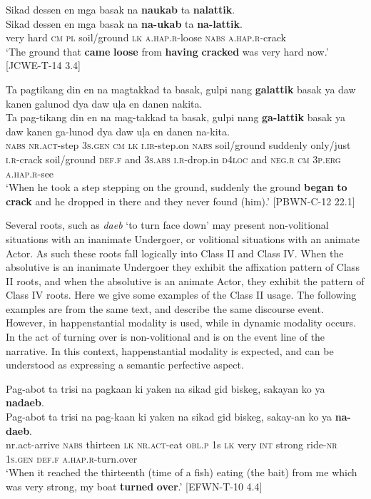 \ea
Sikad  dessen  en  mga  basak  na  \textbf{naukab}  ta  \textbf{nalattik}. \\\smallskip
\gll Sikad  dessen  en  mga  basak  na  \textbf{na-ukab}  ta  \textbf{na-lattik}. \\
very  hard  \textsc{cm}  \textsc{pl}  soil/ground  \textsc{lk}  \textsc{a.hap.r}-loose  \textsc{nabs}  \textsc{a.hap.r}-crack \\
\glt ‘The ground that \textbf{came} \textbf{loose} from \textbf{having} \textbf{cracked} was very hard now.’ [JCWE-T-14 3.4]
\z

\ea
Ta  pagtikang  din  en  na  magtakkad  ta  basak, gulpi  nang  \textbf{galattik}  basak  ya  daw  kanen  galunod  dya daw  uļa  en  danen  nakita. \\\smallskip
\gll Ta  pag-tikang  din  en  na  mag-takkad  ta  basak, gulpi  nang  \textbf{ga-lattik}  basak  ya  daw  kanen  ga-lunod  dya daw  uļa  en  danen  na-kita. \\
\textsc{nabs}  \textsc{nr.act}-step  3\textsc{s.gen}  \textsc{cm}  \textsc{lk}  \textsc{i.ir}-step.on  \textsc{nabs} soil/ground suddenly  only/just  \textsc{i.r}-crack  soil/ground  \textsc{def.f}  and  3\textsc{s.abs}  \textsc{i.r}-drop.in  \textsc{d4loc} and  \textsc{neg.r}  \textsc{cm}  3\textsc{p.erg}  \textsc{a.hap.r}-see \\
\glt ‘When he took a step stepping on the ground, suddenly the ground \textbf{began} \textbf{to} \textbf{crack} and he dropped in there and they never found (him).’ [PBWN-C-12 22.1]
\z

Several roots, such as \textit{daeb} ‘to turn face down’ may present non-volitional situations with an inanimate Undergoer, or volitional situations with an animate Actor. As such these roots fall logically into Class II and Class IV. When the absolutive is an inanimate Undergoer they exhibit the affixation pattern of Class II roots, and when the absolutive is an animate Actor, they exhibit the pattern of Class IV roots. Here we give some examples of the Class II usage. The following examples are from the same text, and describe the same discourse event. However, in  happenstantial modality is used, while in  dynamic modality occurs. In  the act of turning over is non-volitional and is on the event line of the narrative. In this context, happenstantial modality is expected, and can be understood as expressing a semantic perfective aspect. 

\ea
\label{bkm:Ref148966026}
Pag-abot  ta  trisi  na  pagkaan  ki  yaken  na  sikad  gid  biskeg,   sakayan  ko  ya  \textbf{nadaeb}. \\\smallskip
\gll Pag-abot  ta  trisi  na  pag-kaan  ki  yaken  na  sikad  gid  biskeg,   sakay-an  ko  ya  \textbf{na-daeb}. \\
{nr.act}-arrive  \textsc{nabs}  thirteen  \textsc{lk}  \textsc{nr.act}-eat  \textsc{obl.p}  1s  \textsc{lk} very  \textsc{int}  strong
ride-\textsc{nr}  1\textsc{s.gen}  \textsc{def.f}  \textsc{a.hap.r}-turn.over \\
\glt  ‘When it reached the thirteenth (time of a fish) eating (the bait) from me which was very strong, my boat \textbf{turned} \textbf{over}.’ [EFWN-T-10 4.4]
\z

